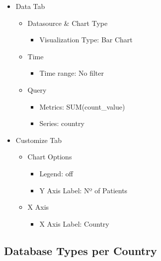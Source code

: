 \documentclass[
]{book}
\providecommand{\tightlist}{%
  \setlength{\itemsep}{0pt}\setlength{\parskip}{0pt}}
\begin{document}
\begin{itemize}
\tightlist
\item
  Data Tab

  \begin{itemize}
  \tightlist
  \item
    Datasource \& Chart Type

    \begin{itemize}
    \tightlist
    \item
      Visualization Type: Bar Chart
    \end{itemize}
  \item
    Time

    \begin{itemize}
    \tightlist
    \item
      Time range: No filter
    \end{itemize}
  \item
    Query

    \begin{itemize}
    \tightlist
    \item
      Metrics: SUM(count\_value)
    \item
      Series: country
    \end{itemize}
  \end{itemize}
\item
  Customize Tab

  \begin{itemize}
  \tightlist
  \item
    Chart Options

    \begin{itemize}
    \tightlist
    \item
      Legend: off
    \item
      Y Axis Label: Nº of Patients
    \end{itemize}
  \item
    X Axis

    \begin{itemize}
    \tightlist
    \item
      X Axis Label: Country
    \end{itemize}
  \end{itemize}
\end{itemize}

\hypertarget{database-types-per-country}{%
\subsection*{Database Types per Country}\label{database-types-per-country}}
\end{document}
